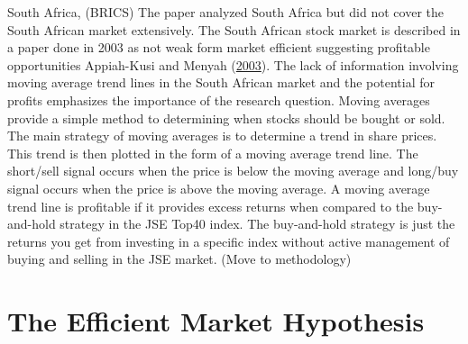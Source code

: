 \documentclass[12pt,preprint, authoryear]{elsarticle}
\numberwithin{equation}{section}
\numberwithin{figure}{section}
\numberwithin{table}{section}
\begin{document}
South Africa, (BRICS) The paper analyzed South Africa but did not cover
the South African market extensively. The South African stock market is
described in a paper done in 2003 as not weak form market efficient
suggesting profitable opportunities Appiah-Kusi and Menyah
(\protect\hyperlink{ref-appiah2003return}{2003}). The lack of
information involving moving average trend lines in the South African
market and the potential for profits emphasizes the importance of the
research question. Moving averages provide a simple method to
determining when stocks should be bought or sold. The main strategy of
moving averages is to determine a trend in share prices. This trend is
then plotted in the form of a moving average trend line. The short/sell
signal occurs when the price is below the moving average and long/buy
signal occurs when the price is above the moving average. A moving
average trend line is profitable if it provides excess returns when
compared to the buy-and-hold strategy in the JSE Top40 index. The
buy-and-hold strategy is just the returns you get from investing in a
specific index without active management of buying and selling in the
JSE market. (Move to methodology)

\section{The Efficient Market
Hypothesis}\label{the-efficient-market-hypothesis}
\end{document}
